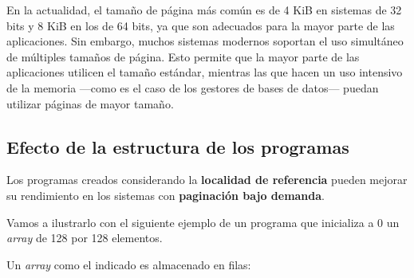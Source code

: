 En la actualidad, el tamaño de página más común es de 4 KiB en sistemas
de 32 bits y 8 KiB en los de 64 bits, ya que son adecuados para la mayor
parte de las aplicaciones. Sin embargo, muchos sistemas modernos
soportan el uso simultáneo de múltiples tamaños de página. Esto permite
que la mayor parte de las aplicaciones utilicen el tamaño estándar,
mientras las que hacen un uso intensivo de la memoria ---como es el caso
de los gestores de bases de datos--- puedan utilizar páginas de mayor
tamaño.

\subsection{Efecto de la estructura de los
programas}\label{_efecto_de_la_estructura_de_los_programas}

Los programas creados considerando la \textbf{localidad de referencia}
pueden mejorar su rendimiento en los sistemas con \textbf{paginación
bajo demanda}.

Vamos a ilustrarlo con el siguiente ejemplo de un programa que
inicializa a 0 un \emph{array} de 128 por 128 elementos.

\begin{Shaded}
\begin{Highlighting}[]
\OperatorTok{[][]} \OperatorTok{=}  \OperatorTok{[}\OperatorTok{][}\OperatorTok{];}

 \OperatorTok{(}\OperatorTok{=} \OperatorTok{;}\OperatorTok{\textless{}} \OperatorTok{;} \OperatorTok{++}\OperatorTok{)}
\OperatorTok{\{}
   \OperatorTok{(}\OperatorTok{=} \OperatorTok{;}\OperatorTok{\textless{}} \OperatorTok{;} \OperatorTok{++}\OperatorTok{)}
  \OperatorTok{\{}
\OperatorTok{[}\OperatorTok{][}\OperatorTok{]} \OperatorTok{=} \OperatorTok{;}
  \OperatorTok{\}}
\OperatorTok{\}}
\end{Highlighting}
\end{Shaded}

Un \emph{array} como el indicado es almacenado en filas:

\begin{Shaded}
\begin{Highlighting}[]
\OperatorTok{[}\OperatorTok{][}\OperatorTok{],}\OperatorTok{[}\OperatorTok{][}\OperatorTok{],} \OperatorTok{[}\OperatorTok{][}\OperatorTok{]}
\OperatorTok{[}\OperatorTok{][}\OperatorTok{],}\OperatorTok{[}\OperatorTok{][}\OperatorTok{],} \OperatorTok{[}\OperatorTok{][}\OperatorTok{]}
\end{Highlighting}
\end{Shaded}

